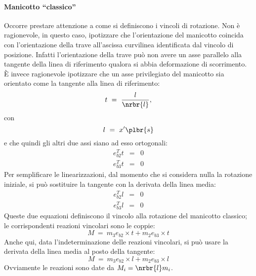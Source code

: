 \documentclass[12pt,dvips,fleqn,italian]{article}
\begin{document}
\paragraph*{Manicotto ``classico''}
Occorre prestare attenzione a come si definiscono i vincoli di rotazione.
Non \`e ragionevole, in questo caso, ipotizzare che l'orientazione 
del manicotto coincida con l'orientazione della trave all'ascissa
curvilinea identificata dal vincolo di posizione.
Infatti l'orientazione della trave pu\`o non avere un asse parallelo
alla tangente della linea di riferimento qualora si abbia deformazione
di scorrimento.
\`E invece ragionevole ipotizzare che un asse privilegiato del manicotto
sia orientato come la tangente alla linea di riferimento:
\begin{displaymath}
	t \ = \ \frac{l}{\nrbr{l}} ,
\end{displaymath}
con 
\begin{displaymath}
	l \ = \ x'\plbr{s}
\end{displaymath}
e che quindi gli altri due assi siano ad esso ortogonali:
\begin{eqnarray*}
	e_{b2}^T t & = & 0 \\
	e_{b3}^T t & = & 0
\end{eqnarray*}
Per semplificare le linearizzazioni, dal momento che si considera nulla
la rotazione iniziale, si pu\`o sostituire la tangente
con la derivata della linea media:
\begin{eqnarray*}
	e_{b2}^T l & = & 0 \\
	e_{b3}^T l & = & 0
\end{eqnarray*}
Queste due equazioni definiscono il vincolo alla rotazione del manicotto 
classico; le corrispondenti reazioni vincolari sono le coppie:
\begin{displaymath}
	M \ = \ m_3 e_{b2}\times{t} + m_2 e_{b3}\times{t}
\end{displaymath}
Anche qui, data l'indeterminazione delle reazioni vincolari, si pu\`o 
usare la derivata della linea media al posto della tangente:
\begin{displaymath}
	M \ = \ m_3 e_{b2}\times{l} + m_2 e_{b3}\times{l}
\end{displaymath}
Ovviamente le reazioni sono date da $M_i=\nrbr{l}m_i$.
\end{document}
